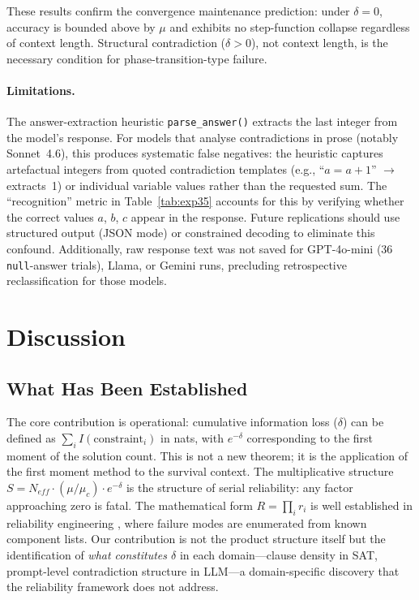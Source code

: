\documentclass[11pt,a4paper]{article}
\begin{document}
\noindent These results confirm the convergence maintenance prediction: under $\delta = 0$, accuracy is bounded above by $\mu$ and exhibits no step-function collapse regardless of context length. Structural contradiction ($\delta > 0$), not context length, is the necessary condition for phase-transition-type failure.

\paragraph{Limitations.}
\label{sec:exp35-limitations}
The answer-extraction heuristic \texttt{parse\_answer()} extracts the last integer from the model's response. For models that analyse contradictions in prose (notably Sonnet~4.6), this produces systematic false negatives: the heuristic captures artefactual integers from quoted contradiction templates (e.g., ``$a = a + 1$'' $\to$ extracts~1) or individual variable values rather than the requested sum. The ``recognition'' metric in Table~\ref{tab:exp35} accounts for this by verifying whether the correct values $a$, $b$, $c$ appear in the response. Future replications should use structured output (JSON mode) or constrained decoding to eliminate this confound. Additionally, raw response text was not saved for GPT-4o-mini (36 \texttt{null}-answer trials), Llama, or Gemini runs, precluding retrospective reclassification for those models.

\section{Discussion}
\label{sec:discussion}

\subsection{What Has Been Established}

The core contribution is operational: cumulative information loss ($\delta$) can be defined as $\sum_i I(\text{constraint}_i)$ in nats, with $e^{-\delta}$ corresponding to the first moment of the solution count. This is not a new theorem; it is the application of the first moment method \citep{alon2016} to the survival context. The multiplicative structure $S = N_{eff} \cdot (\mu/\mu_c) \cdot e^{-\delta}$ is the structure of serial reliability: any factor approaching zero is fatal. The mathematical form $R = \prod_i r_i$ is well established in reliability engineering \citep{barlow1975}, where failure modes are enumerated from known component lists. Our contribution is not the product structure itself but the identification of \emph{what constitutes $\delta$} in each domain---clause density in SAT, prompt-level contradiction structure in LLM---a domain-specific discovery that the reliability framework does not address.
\end{document}
